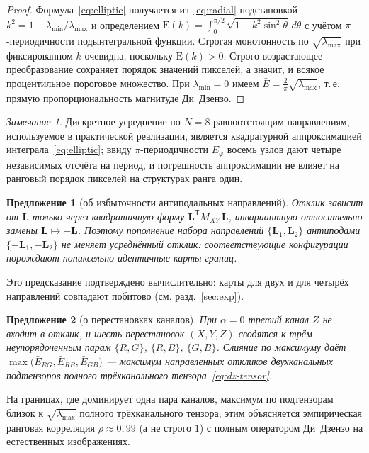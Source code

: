\documentclass[11pt,a4paper]{article}
\theoremstyle{plain}
\newtheorem{proposition}{Предложение}
\theoremstyle{definition}
\theoremstyle{remark}
\newtheorem{remark}{Замечание}
\newcommand{\Lvec}{\mathbf{L}}
\newcommand{\lmax}{\lambda_{\max}}
\newcommand{\lmin}{\lambda_{\min}}
\newcommand{\Mxy}{M_{XY}}
\newcommand{\T}{^{\mathsf T}}
\begin{document}
\begin{proof}
Формула~\eqref{eq:elliptic} получается из~\eqref{eq:radial} подстановкой
$k^2 = 1 - \lmin/\lmax$ и определением $\mathrm E(k) = \int_0^{\pi/2}
\sqrt{1 - k^2 \sin^2\theta}\, d\theta$ с учётом $\pi$-периодичности
подынтегральной функции. Строгая монотонность по $\sqrt{\lmax}$ при
фиксированном $k$ очевидна, поскольку $\mathrm E(k) > 0$. Строго
возрастающее преобразование сохраняет порядок значений пикселей, а значит,
и всякое процентильное пороговое множество. При $\lmin = 0$ имеем
$\bar E = \tfrac{2}{\pi}\sqrt{\lmax}$, т.\,е. прямую пропорциональность
магнитуде Ди~Дзензо.
\end{proof}

\begin{remark}
Дискретное усреднение по $N = 8$ равноотстоящим направлениям, используемое
в практической реализации, является квадратурной аппроксимацией
интеграла~\eqref{eq:elliptic}; ввиду $\pi$-периодичности
$E_\varphi$ восемь узлов дают четыре независимых отсчёта на период, и
погрешность аппроксимации не влияет на ранговый порядок пикселей на
структурах ранга один.
\end{remark}

\begin{proposition}[об избыточности антиподальных направлений]
\label{prop:mode}
Отклик зависит от $\Lvec$ только через квадратичную форму
$\Lvec\T \Mxy\, \Lvec$, инвариантную относительно замены
$\Lvec \mapsto -\Lvec$. Поэтому пополнение набора направлений
$\{\Lvec_1, \Lvec_2\}$ антиподами $\{-\Lvec_1, -\Lvec_2\}$ не меняет
усреднённый отклик: соответствующие конфигурации порождают попиксельно
идентичные карты границ.
\end{proposition}

Это предсказание подтверждено вычислительно: карты для двух и для четырёх
направлений совпадают побитово (см. разд.~\ref{sec:exp}).

\begin{proposition}[о перестановках каналов]
\label{prop:perms}
При $\alpha = 0$ третий канал $Z$ не входит в отклик, и шесть перестановок
$(X, Y, Z)$ сводятся к трём неупорядоченным парам $\{R,G\}$, $\{R,B\}$,
$\{G,B\}$. Слияние по максимуму даёт
$\max\bigl(\bar E_{RG}, \bar E_{RB}, \bar E_{GB}\bigr)$ --- максимум
направленных откликов двухканальных подтензоров полного трёхканального
тензора~\eqref{eq:dz-tensor}.
\end{proposition}

На границах, где доминирует одна пара каналов, максимум по подтензорам
близок к $\sqrt{\lmax}$ полного трёхканального тензора; этим объясняется
эмпирическая ранговая корреляция $\rho \approx 0{,}99$ (а не строго $1$)
с полным оператором Ди~Дзензо на естественных изображениях.
\end{document}

